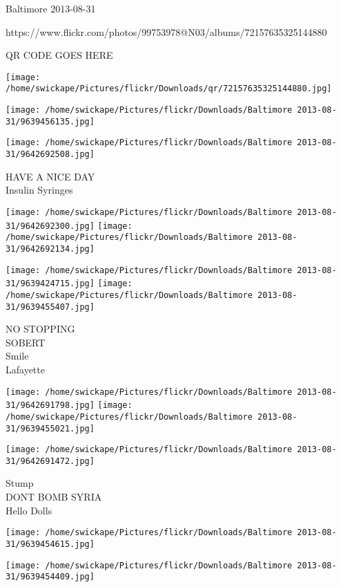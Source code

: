 \documentclass[10pt,letterpaper]{article}
\begin{document}
Baltimore 2013-08-31

https://www.flickr.com/photos/99753978@N03/albums/72157635325144880

QR CODE GOES HERE

\texttt{[image: /home/swickape/Pictures/flickr/Downloads/qr/72157635325144880.jpg]}
\pagebreak

\texttt{[image: /home/swickape/Pictures/flickr/Downloads/Baltimore 2013-08-31/9639456135.jpg]}

\vspace{0.25in}
\texttt{[image: /home/swickape/Pictures/flickr/Downloads/Baltimore 2013-08-31/9642692508.jpg]}

HAVE A NICE DAY\\
Insulin Syringes\\
\pagebreak

\texttt{[image: /home/swickape/Pictures/flickr/Downloads/Baltimore 2013-08-31/9642692300.jpg]}
\texttt{[image: /home/swickape/Pictures/flickr/Downloads/Baltimore 2013-08-31/9642692134.jpg]}

\texttt{[image: /home/swickape/Pictures/flickr/Downloads/Baltimore 2013-08-31/9639424715.jpg]}
\texttt{[image: /home/swickape/Pictures/flickr/Downloads/Baltimore 2013-08-31/9639455407.jpg]}

NO STOPPING\\
SOBERT\\
Smile\\
Lafayette\\
\pagebreak

\texttt{[image: /home/swickape/Pictures/flickr/Downloads/Baltimore 2013-08-31/9642691798.jpg]}
\texttt{[image: /home/swickape/Pictures/flickr/Downloads/Baltimore 2013-08-31/9639455021.jpg]}

\texttt{[image: /home/swickape/Pictures/flickr/Downloads/Baltimore 2013-08-31/9642691472.jpg]}

Stump\\
DONT BOMB SYRIA\\
Hello Dolls\\
\pagebreak

\texttt{[image: /home/swickape/Pictures/flickr/Downloads/Baltimore 2013-08-31/9639454615.jpg]}

\vspace{0.25in}
\texttt{[image: /home/swickape/Pictures/flickr/Downloads/Baltimore 2013-08-31/9639454409.jpg]}
\end{document}
